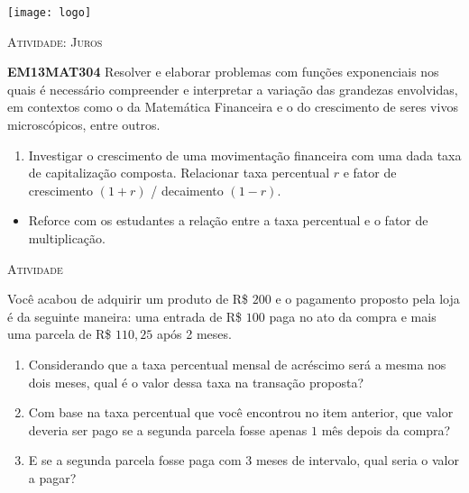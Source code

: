 \documentclass[10 pt,usenames,dvipsnames, oneside]{article}
\begin{document}
\begin{center}
  \begin{minipage}[l]{3cm}
\texttt{[image: logo]}    
\end{minipage}\hfill
\begin{minipage}[r]{.8\textwidth}
 {\Large \scshape Atividade: Juros}  
\end{minipage}
\end{center}
\vspace{.2cm}

\ifdefined\prof
\begin{objetivos}
\item \textbf{EM13MAT304} Resolver e elaborar problemas com funções exponenciais nos quais é necessário compreender e interpretar a variação das grandezas envolvidas, em contextos como o da Matemática Financeira e o do crescimento de seres vivos microscópicos, entre outros. 
\end{objetivos}

\begin{goals}
\begin{enumerate}
\item Investigar o crescimento de uma movimentação financeira com uma dada taxa de capitalização composta. Relacionar taxa percentual $r$ e fator de crescimento $(1+r)$ / decaimento $(1 - r)$.
\end{enumerate}

\tcblower

\begin{itemize}
\item Reforce com os estudantes a relação entre a taxa percentual e o fator de multiplicação. 
\end{itemize}
\end{goals}

\bigskip
\begin{center}
{\large \scshape Atividade}
\end{center}
\fi

Você acabou de adquirir um produto de R\$ $200$ e o pagamento proposto pela loja é da seguinte maneira: uma entrada de R\$ $100$ paga no ato da compra e mais uma parcela de  R\$ $110{,}25$ após 2 meses.

\begin{enumerate}

\item{}
Considerando que a taxa percentual mensal de acréscimo será a mesma nos dois meses, qual é o valor dessa taxa na transação proposta?

\item{}
Com base na taxa percentual que você encontrou no item anterior, que valor deveria ser pago se a segunda parcela fosse apenas $1$ mês depois da compra?

\item{}
E se a segunda parcela fosse paga com $3$ meses de intervalo, qual seria o valor a pagar? 

\end{enumerate}
\end{document}
